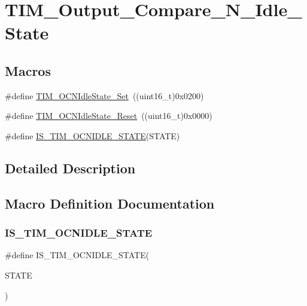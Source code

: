 \hypertarget{group___t_i_m___output___compare___n___idle___state}{}\section{T\+I\+M\+\_\+\+Output\+\_\+\+Compare\+\_\+\+N\+\_\+\+Idle\+\_\+\+State}
\label{group___t_i_m___output___compare___n___idle___state}
\subsection*{Macros}
\begin{DoxyCompactItemize}
\item 
\#define \mbox{\hyperlink{group___t_i_m___output___compare___n___idle___state_ga980392da6eb5bedcbf7ed353e1073f99}{T\+I\+M\+\_\+\+O\+C\+N\+Idle\+State\+\_\+\+Set}}~((uint16\+\_\+t)0x0200)
\item 
\#define \mbox{\hyperlink{group___t_i_m___output___compare___n___idle___state_ga329a32820cdba0af9c4b7a04177e8fdd}{T\+I\+M\+\_\+\+O\+C\+N\+Idle\+State\+\_\+\+Reset}}~((uint16\+\_\+t)0x0000)
\item 
\#define \mbox{\hyperlink{group___t_i_m___output___compare___n___idle___state_ga0987091d1d03ba2db065efb66eff3951}{I\+S\+\_\+\+T\+I\+M\+\_\+\+O\+C\+N\+I\+D\+L\+E\+\_\+\+S\+T\+A\+TE}}(S\+T\+A\+TE)
\end{DoxyCompactItemize}


\subsection{Detailed Description}


\subsection{Macro Definition Documentation}
\mbox{\label{group___t_i_m___output___compare___n___idle___state_ga0987091d1d03ba2db065efb66eff3951}} 
\subsubsection{\texorpdfstring{IS\_TIM\_OCNIDLE\_STATE}{IS\_TIM\_OCNIDLE\_STATE}}
{\footnotesize\ttfamily \#define I\+S\+\_\+\+T\+I\+M\+\_\+\+O\+C\+N\+I\+D\+L\+E\+\_\+\+S\+T\+A\+TE(\begin{DoxyParamCaption}\item[{}]{S\+T\+A\+TE }\end{DoxyParamCaption})}

